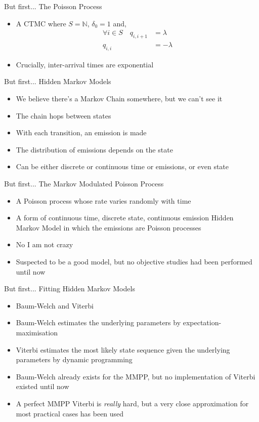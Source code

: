 \documentclass{beamer}
\begin{document}
\begin{frame}{But first...}
The Poisson Process
\begin{itemize}
\pause \item A CTMC where $S = \mathbb{N}$, $\delta_0 = 1$ and,
\begin{align*}
\forall i \in S \quad q_{i,i+1} &= \lambda \\
q_{i,i} &= -\lambda
\end{align*}
\pause \item Crucially, inter-arrival times are exponential
\end{itemize}
\end{frame}

\begin{frame}{But first...}
Hidden Markov Models
\begin{itemize}
\pause \item We believe there's a Markov Chain somewhere, but we can't see it
\pause \item The chain hops between states
\pause \item With each transition, an emission is made
\pause \item The distribution of emissions depends on the state
\pause \item Can be either discrete or continuous time or emissions, or even state
\end{itemize}
\end{frame}

\begin{frame}{But first...}
The Markov Modulated Poisson Process
\begin{itemize}
\pause \item A Poisson process whose rate varies randomly with time
\pause \item A form of continuous time, discrete state, continuous emission Hidden Markov Model in which the emissions are Poisson processes
\pause \item No I am not crazy
\pause \item Suspected to be a good model, but no objective studies had been performed until now
\end{itemize}
\end{frame}

\begin{frame}{But first...}
Fitting Hidden Markov Models
\begin{itemize}
\pause \item Baum-Welch and Viterbi
\pause \item Baum-Welch estimates the underlying parameters by expectation-maximisation
\pause \item Viterbi estimates the most likely state sequence given the underlying parameters by dynamic programming
\pause \item Baum-Welch already exists for the MMPP, but no implementation of Viterbi existed until now
\pause \item A perfect MMPP Viterbi is \emph{really} hard, but a very close approximation for most practical cases has been used
\end{itemize}
\end{frame}
\end{document}
